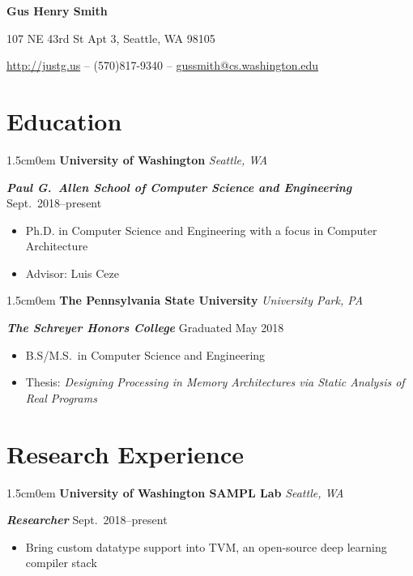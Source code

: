 \documentclass[letterpaper]{article}
\newcommand{\primaryindent}{1.5cm} %
\newcommand{\name}[1]{ 
	\Huge  \textsf{\textbf{#1}}
	\vspace{0.1em}
	\par \normalsize \normalfont}
\newcommand{\personalinfo}[1]{
	\large  #1 
	\par \normalsize \normalfont}
\newenvironment{indented}{\begin{adjustwidth}{\primaryindent}{0em}}{\end{adjustwidth}}
\newenvironment{resumelist}{\begin{itemize}[topsep=0pt,noitemsep,itemindent=-15pt,leftmargin=30pt]}{\end{itemize}}
\newcommand{\generalentry}[5]{
	\begin{indented}
		\Large \textsf{\textbf{#1}} \hfill	%
			\hfill\normalsize\textit{#2} \par  			%
		\noindent \large \textsf{\textbf{\textit{#3}}} 	%
			\hfill \normalsize #4\par 					%
		\normalsize \normalfont #5 \par					%
		\normalsize \normalfont
	\end{indented}
	}
\begin{document}
	
	
\begin{center}
	\name{Gus Henry Smith}
	\personalinfo{107 NE 43rd St Apt 3, Seattle, WA 98105}
	\personalinfo{\url{http://justg.us} -- (570)817-9340 -- \href{mailto:gussmith@cs.washington.edu}{gussmith@cs.washington.edu}}
\end{center}

\section*{Education}

\generalentry{University of Washington}{Seattle, WA}{Paul G.~Allen School of Computer Science and Engineering}{Sept.~2018--present}{
	\begin{resumelist}
		\item Ph.D. in Computer Science and Engineering with a focus in Computer Architecture
		\item Advisor: Luis Ceze
	\end{resumelist}
}

\vspace{2mm}

\generalentry{The Pennsylvania State University}{University Park, PA}{The Schreyer Honors College}{Graduated May 2018}{
	\begin{resumelist}
		\item B.S/M.S.~in Computer Science and Engineering
		\item Thesis: \textit{Designing Processing in Memory Architectures via Static Analysis of Real Programs}
	\end{resumelist}
}

\section*{Research Experience}


\generalentry{University of Washington SAMPL Lab}{Seattle, WA}{Researcher}{Sept.~2018--present}{		
  \begin{resumelist}
    \item Bring custom datatype support into TVM, an open-source deep learning compiler stack
  \end{resumelist}
}

\vspace{2mm}
\end{document}
